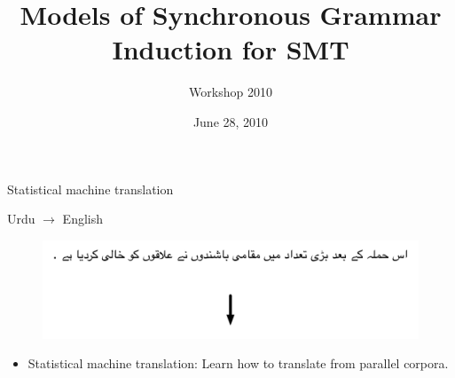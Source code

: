 \documentclass{beamer}
\title[Models of SCFG Induction]{Models of Synchronous Grammar Induction for SMT}
\author[CLSP Workshop 2010]{
  Workshop 2010
}
\institute[Baltimore]{
  The Center for Speech and Language Processing \\ Johns Hopkins University
}
\date[June 28]{June 28, 2010}
\begin{document}
\begin{frame}
  \titlepage
\end{frame}

 





\begin{frame}[t]{Statistical machine translation}
\begin{exampleblock}{Urdu $\rightarrow$ English}
  \begin{figure}
    {\centering \includegraphics[scale=0.55]{urdu.pdf}}
  \end{figure}
\vspace{0.10cm}
\end{exampleblock}
\begin{itemize}
  \item Statistical machine translation: Learn how to translate from parallel corpora.
\end{itemize}
\end{frame}
\end{document}
